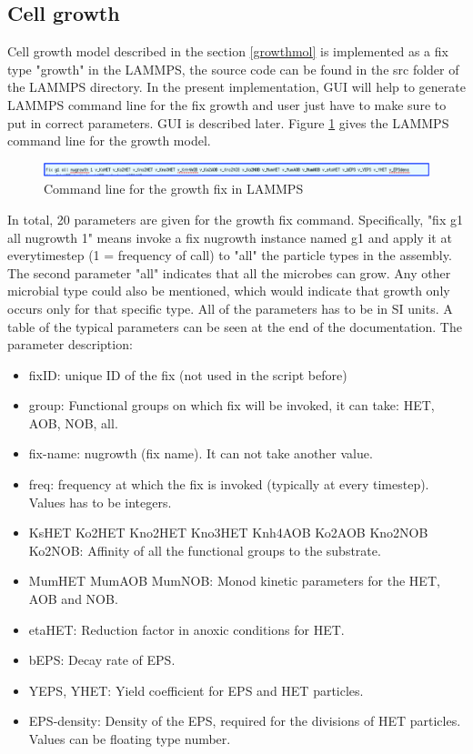 \documentclass[11pt,a4paper,openright]{article}
\begin{document}
\subsection{Cell growth}
Cell growth model described in the section \ref{growthmol} is implemented as a fix type "growth" in the LAMMPS, the source code can be found in the src folder of the LAMMPS directory. In the present implementation, GUI will help to generate LAMMPS command line for the fix growth and user just have to make sure to put in correct parameters. GUI is described later. Figure \ref{fig:growth} gives the LAMMPS command line for the growth model.

\begin{figure}[H]
\begin{center}
  \includegraphics[width=0.98\columnwidth]{Figs/growthfix.pdf}
\caption{Command line for the growth fix in LAMMPS}
\label{fig:growth}       %
\end{center}
\end{figure}
 
In total, 20 parameters are given for the growth fix command. Specifically, "fix g1 all nugrowth 1" means invoke a fix nugrowth instance named g1 and apply it at everytimestep (1 = frequency of call) to "all" the particle types in the assembly. The second parameter "all" indicates that all the microbes can grow. Any other microbial type could also be mentioned, which would indicate that growth only occurs only for that specific type. All of the parameters has to be in SI units. A table of the typical parameters can be seen at the end of the documentation. The parameter description:

\begin{itemize}
\item fixID: unique ID of the fix (not used in the script before)
\item group: Functional groups on which fix will be invoked, it can take: HET, AOB, NOB, all.
\item fix-name: nugrowth (fix name). It can not take another value.
\item freq: frequency at which the fix is invoked (typically at every timestep). Values has to be integers.
\item KsHET Ko2HET Kno2HET Kno3HET Knh4AOB Ko2AOB Kno2NOB Ko2NOB: Affinity of all the functional groups to the substrate.
\item MumHET MumAOB MumNOB: Monod kinetic parameters for the HET, AOB and NOB.
\item etaHET: Reduction factor in anoxic conditions for HET.
\item bEPS: Decay rate of EPS.
\item YEPS, YHET: Yield coefficient for EPS and HET particles.
\item EPS-density: Density of the EPS, required for the divisions of HET particles. Values can be floating type number.
\end{itemize}
\end{document}
